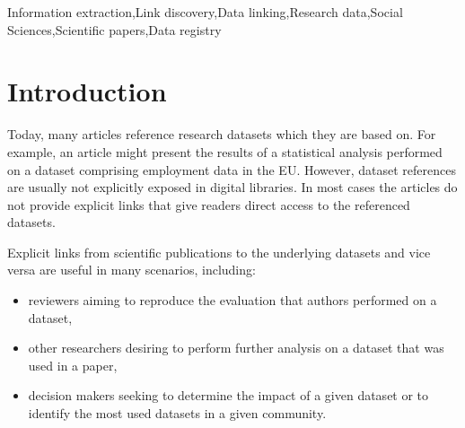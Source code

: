 \documentclass{IOS-Book-Article}
\begin{document}
\begin{frontmatter}
\begin{abstract}
\end{abstract}

\begin{keyword}
Information extraction\sep Link discovery\sep Data linking\sep Research data\sep Social Sciences\sep Scientific papers\sep Data registry
\end{keyword}
\end{frontmatter}
\section{Introduction}
Today, 
many articles reference research datasets which they are based on.
For example, an article might present the results of a statistical analysis performed on a dataset comprising employment data in the EU.
However, dataset references are usually not explicitly exposed in digital libraries.
In most cases the articles do not provide explicit links that give readers direct access to the referenced datasets. 

Explicit links from scientific publications to the underlying datasets and vice versa are useful in many scenarios, including:
\begin{itemize}
	\item reviewers aiming to reproduce the evaluation that authors performed on a dataset, 
	\item other researchers desiring to perform further analysis on a dataset that was used in a paper,
	\item decision makers seeking to determine the impact of a given dataset or to identify the most used datasets in a given community.
\end{itemize}
\end{document}
